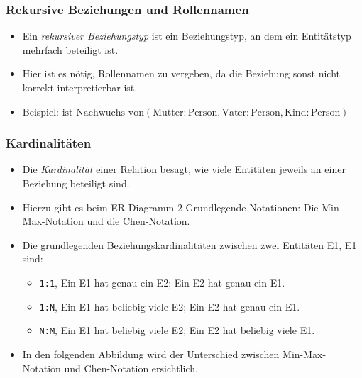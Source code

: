             \subsubsection{Rekursive Beziehungen und Rollennamen} %
                \begin{itemize}
                	\item Ein \textit{rekursiver Beziehungstyp} ist ein Beziehungstyp, an dem ein Entitätstyp mehrfach beteiligt ist.
                	\item Hier ist es nötig, Rollennamen zu vergeben, da die Beziehung sonst nicht korrekt interpretierbar ist.
                	\item Beispiel: \( \text{ist-Nachwuchs-von}(\text{Mutter}: \text{Person}, \text{Vater}: \text{Person}, \text{Kind}: \text{Person}) \)
                \end{itemize}
            	\begin{figure}[H]
            		\centering
            	\end{figure}

            \subsubsection{Kardinalitäten} %
                \begin{itemize}
                	\item Die \textit{Kardinalität} einer Relation besagt, wie viele Entitäten jeweils an einer Beziehung beteiligt sind.
                	\item Hierzu gibt es beim ER-Diagramm 2 Grundlegende Notationen: Die Min-Max-Notation und die Chen-Notation.
                	\item Die grundlegenden Beziehungskardinalitäten zwischen zwei Entitäten E1, E1 sind:
                		\begin{itemize}
                			\item \texttt{1:1}, Ein E1 hat genau ein E2; Ein E2 hat genau ein E1.
                			\item \texttt{1:N}, Ein E1 hat beliebig viele E2; Ein E2 hat genau ein E1.
                			\item \texttt{N:M}, Ein E1 hat beliebig viele E2; Ein E2 hat beliebig viele E1.
                		\end{itemize}
                	\item In den folgenden Abbildung wird der Unterschied zwischen \textcolor{TUDa-4c}{Min-Max-Notation} und \textcolor{TUDa-1b}{Chen-Notation} ersichtlich.
                \end{itemize}
            
